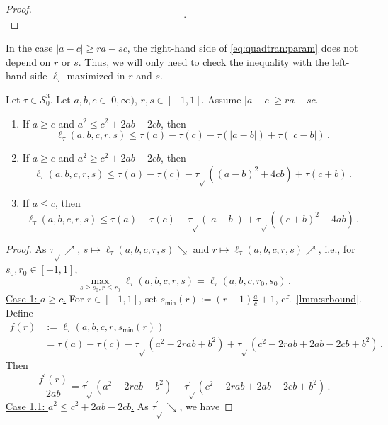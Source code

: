 \documentclass{article}
\newcommand{\abs}[1]{\left| #1 \right|} %
\newcommand*{\mc}[1]{\mathcal{#1}}
\newcommand*{\ms}[1]{\mathsf{#1}}
\newcommand{\Rp}{[0, \infty)} %
\newcommand{\pr}{^\prime}
\newcommand{\equationFullstop}{\, .}
\newcommand{\eqfs}{\equationFullstop}
\newcommand{\tran}{\tau}
\newcommand{\trans}{\tran_{\!\sqrt{}}}
\newcommand{\dtrans}{\trans\pr}
\newcommand{\setccod}[1]{\mc S_0^{#1}}
\newcommand{\lhs}{\ell_{\tran}}
\newcommand{\incr}{\nearrow}
\newcommand{\decr}{\searrow}
\begin{document}
\begin{appendix}
\begin{proof}
\begin{equation*}
		\eqfs
	\end{equation*}
\end{proof}
%
In the case $|a-c| \geq ra-sc$, the right-hand side of \eqref{eq:quadtran:param} does not depend on $r$ or $s$. Thus, we will only need to check the inequality with the left-hand side $\lhs$ maximized in $r$ and $s$.
%
\begin{lemma}\label{lmm:maxlhs}
	Let $\tran\in\setccod3$.  Let $a,b,c\in\Rp$, $r,s\in[-1, 1]$. Assume $|a-c| \geq ra-sc$.
	\begin{enumerate}[label=(\roman*)]
		\item If $a\geq c$ and $a^2 \leq c^2+2ab-2cb$, then
		\begin{equation*}
			\lhs(a,b,c,r,s) \leq \tran(a)-\tran(c)-\tran(|a-b|)+\tran(|c-b|)
			\eqfs
		\end{equation*}
		\item If $a\geq c$ and $a^2 \geq c^2+2ab-2cb$, then
		\begin{equation*}
			\lhs(a,b,c,r,s) \leq  \tran(a)-\tran(c)-\trans((a-b)^2+4cb)+\tran(c+b)
			\eqfs
		\end{equation*}
		\item If $a\leq c$, then
		\begin{equation*}
			\lhs(a,b,c,r,s) \leq \tran(a)-\tran(c)-\trans(\abs{a-b})+\trans((c+b)^2-4ab)
			\eqfs
		\end{equation*}
	\end{enumerate}
\end{lemma}
%
\begin{proof}
	As $\trans\incr$, $s\mapsto\lhs(a,b,c,r,s) \decr$ and $r\mapsto\lhs(a,b,c,r,s) \incr$, i.e., for $s_0,r_0\in[-1,1]$, 
	\begin{equation*}
		\max_{s\geq s_0, r\leq r_0} \lhs(a,b,c,r,s) = \lhs(a,b,c,r_0,s_0)
		\eqfs
	\end{equation*}
	\underline{Case 1: $a\geq c$.} For $r\in[-1,1]$, set $s_{\ms{min}}(r) := (r-1) \frac ac+1$, cf.\ \cref{lmm:srbound}. Define
	\begin{align*}
		f(r) &:= \lhs(a,b,c,r,s_{\ms{min}}(r)) 
		\\&= \tran(a)-\tran(c)-\trans(a^2-2rab+b^2)+\trans(c^2-2rab+2ab-2cb+b^2)
		\eqfs
	\end{align*}
	Then
	\begin{equation*}
		\frac{f\pr(r)}{2ab} = \dtrans(a^2-2rab+b^2) - \dtrans(c^2-2rab+2ab-2cb+b^2)
		\eqfs
	\end{equation*}
	\underline{Case 1.1: $a^2 \leq c^2+2ab-2cb$.} As $\dtrans\decr$, we have

\end{proof}
\end{appendix}
\end{document}
